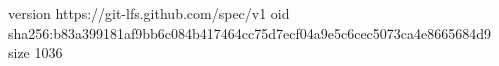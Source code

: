 version https://git-lfs.github.com/spec/v1
oid sha256:b83a399181af9bb6c084b417464cc75d7ecf04a9e5c6cec5073ca4e8665684d9
size 1036
